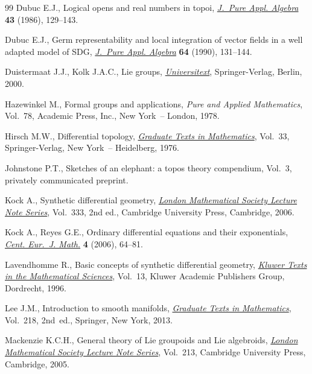\documentclass[pdftex]{sigma}
\numberwithin{equation}{section}
\begin{document}
\begin{thebibliography}{99}
Dubuc E.J., Logical opens and real numbers in topoi, \href{https://doi.org/10.1016/0022-4049(86)90091-5}{\textit{J.~Pure Appl.
 Algebra}} \textbf{43} (1986), 129--143.

Dubuc E.J., Germ representability and local integration of vector f\/ields in a
 well adapted model of {SDG}, \href{https://doi.org/10.1016/0022-4049(90)90152-8}{\textit{J.~Pure Appl. Algebra}} \textbf{64}
 (1990), 131--144.

Duistermaat J.J., Kolk J.A.C., Lie groups, \href{https://doi.org/10.1007/978-3-642-56936-4}{\textit{Universitext}}, Springer-Verlag,
 Berlin, 2000.

Hazewinkel M., Formal groups and applications, \textit{Pure and Applied
 Mathematics}, Vol.~78, Academic Press, Inc., New York~-- London, 1978.

Hirsch M.W., Dif\/ferential topology, \href{https://doi.org/10.1007/978-1-4684-9449-5}{\textit{Graduate Texts in Mathematics}},
 Vol.~33, Springer-Verlag, New York~-- Heidelberg, 1976.

Johnstone P.T., Sketches of an elephant: a topos theory compendium, {V}ol.~3,
 {p}rivately communicated preprint.

Kock A., Synthetic dif\/ferential geometry, \href{https://doi.org/10.1017/CBO9780511550812}{\textit{London Mathematical Society
 Lecture Note Series}}, Vol.~333, 2nd ed., Cambridge University Press,
 Cambridge, 2006.

Kock A., Reyes G.E., Ordinary dif\/ferential equations and their exponentials,
 \href{https://doi.org/10.1007/s11533-005-0005-2}{\textit{Cent. Eur.~J. Math.}} \textbf{4} (2006), 64--81.

Lavendhomme R., Basic concepts of synthetic dif\/ferential geometry,
 \href{https://doi.org/10.1007/978-1-4757-4588-7}{\textit{Kluwer Texts in the Mathematical Sciences}}, Vol.~13, Kluwer Academic
 Publishers Group, Dordrecht, 1996.

Lee J.M., Introduction to smooth manifolds, \href{https://doi.org/10.1007/978-1-4419-9982-5}{\textit{Graduate Texts in
 Mathematics}}, Vol.~218, 2nd~ed., Springer, New York, 2013.

Mackenzie K.C.H., General theory of {L}ie groupoids and {L}ie algebroids,
 \href{https://doi.org/10.1017/CBO9781107325883}{\textit{London Mathematical Society Lecture Note Series}}, Vol.~213, Cambridge
 University Press, Cambridge, 2005.


\end{thebibliography}
\end{document}
